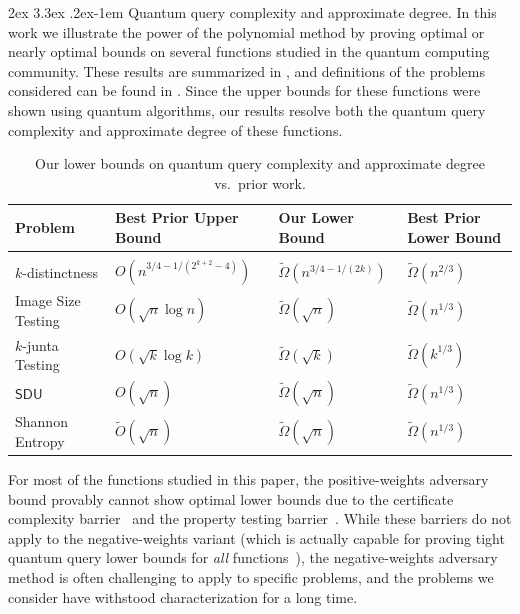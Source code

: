 \documentclass[11pt, letterpaper, fleqn]{article}
\makeatletter
\newcommand{\para}{
  \@startsection{paragraph}{4}
  {\z@}{2ex \@plus 3.3ex \@minus .2ex}{-1em}
  {\normalfont\normalsize\bfseries}
}
\theoremstyle{plain}
\newcommand{\SDU}{\mathsf{ SDU}}
\makeatother
\begin{document}
\para{Quantum query complexity and approximate degree.} 
In this work we illustrate the power of the polynomial method by proving optimal or nearly optimal bounds on several functions studied in the quantum computing community. These results are summarized in , and definitions of the problems considered can be found in .
Since the upper bounds for these functions were shown using quantum algorithms, our results resolve both the quantum query complexity and approximate degree of these functions.

\setlength{\tabcolsep}{9pt}
\renewcommand{\arraystretch}{1.3}
\begin{table}[t]
\centering
{\small
\begin{tabular}{ l l l l }
\hline
Problem & Best Prior Upper Bound & Our Lower Bound & Best Prior Lower Bound \\
\hline
& & &\\[-12pt]
$k$-distinctness 
& $O(n^{3/4-1/{(2^{k + 2} - 4)}})$ \cite{belovs} 
& $\tilde{\Omega}(n^{3/4-{1}/{(2k)}})$ 
& $\tilde{\Omega}(n^{2/3})$ \cite{aaronsonshi}\\[1pt]
Image Size Testing 
& $O(\sqrt{n} \log n)$ \cite{juntatesting} 
& $\tilde{\Omega}(\sqrt{n})$ 
& $\tilde{\Omega}(n^{1/3})$ \cite{juntatesting} \\
$k$-junta Testing 
& $O(\sqrt{k} \log k)$ \cite{juntatesting} 
& $\tilde{\Omega}(\sqrt{k})$ 
& $\tilde{\Omega}(k^{1/3})$ \cite{juntatesting} \\
$\SDU$ 
& $O(\sqrt{n})$ \cite{bravyi} 
& $\tilde{\Omega}(\sqrt{n})$
& $\tilde{\Omega}(n^{1/3})$ \cite{bravyi, aaronsonshi} \\
Shannon Entropy 
& $\tilde{O}(\sqrt{n})$ \cite{bravyi, entropy} 
& $\tilde{\Omega}(\sqrt{n})$ 
& $\tilde{\Omega}(n^{1/3})$ \cite{entropy} \\[4pt]
\hline
\end{tabular}
\caption{Our lower bounds on quantum query complexity and approximate degree vs.~prior work.}
\label{tab:summary}
}
\end{table}


For most of the functions studied in this paper, the positive-weights adversary bound provably cannot show optimal lower bounds due to the certificate complexity barrier~\cite{Zha05, spalekszegedy} and the property testing barrier~\cite{negativeweights}. 
While these barriers do not apply to the negative-weights variant (which is actually capable for proving tight quantum query lower bounds for \emph{all} functions~\cite{adversary2,LMR+11}), the negative-weights adversary method is often challenging to apply to specific problems, and the problems we consider have withstood characterization for a long time.
\end{document}
